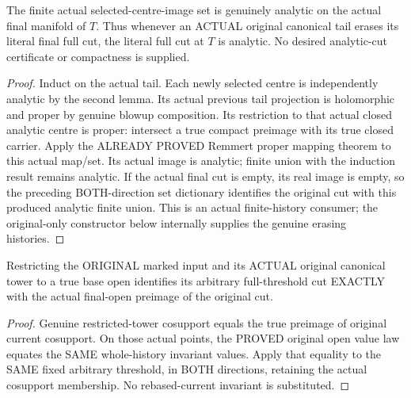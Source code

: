 \begin{theorem}
\label{hir:original-finite-selected-centre-images-analytic-erasure}
\leanok
The finite actual selected-centre-image set is genuinely analytic on the
actual final manifold of $T$. Thus whenever an ACTUAL original canonical
tail erases its literal final full cut, the literal full cut at $T$ is
analytic. No desired analytic-cut certificate or compactness is supplied.
\end{theorem}
\begin{proof}
Induct on the actual tail. Each newly selected centre is independently
analytic by the second lemma. Its actual previous tail projection is
holomorphic and proper by genuine blowup composition. Its restriction to
that actual closed analytic centre is proper: intersect a true compact
preimage with its true closed carrier. Apply the ALREADY PROVED Remmert
proper mapping theorem to this actual map/set. Its actual image is analytic;
finite union with the induction result remains analytic. If the actual
final cut is empty, its real image is empty, so the preceding BOTH-direction
set dictionary identifies the original cut with this produced analytic
finite union. This is an actual finite-history consumer; the original-only
constructor below internally supplies the genuine erasing histories.
\end{proof}

\begin{lemma}
\label{hir:original-arbitrary-full-cut-true-open-preimage}
\leanok
Restricting the ORIGINAL marked input and its ACTUAL original canonical
tower to a true base open identifies its arbitrary full-threshold cut
EXACTLY with the actual final-open preimage of the original cut.
\end{lemma}
\begin{proof}
Genuine restricted-tower cosupport equals the true preimage of original
current cosupport. On those actual points, the PROVED original open value
law equates the SAME whole-history invariant values. Apply that equality
to the SAME fixed arbitrary threshold, in BOTH directions, retaining the
actual cosupport membership. No rebased-current invariant is substituted.
\end{proof}

